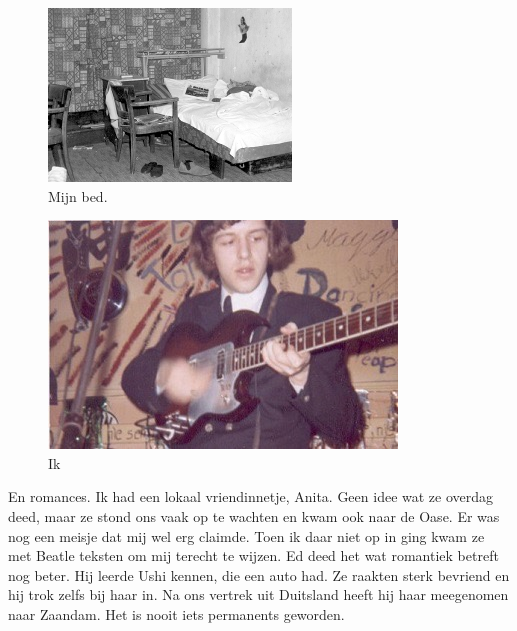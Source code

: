 \documentclass[10pt,twoside, openright]{memoir}
\begin{document}
\begin{figure}
\includegraphics[width=\textwidth]{img/ch29/soest}
\caption*{\footnotesize Mijn bed.}
\end{figure}

\begin{figure}
\includegraphics[width=\textwidth]{img/ch29/rockadzaan4}
\caption*{\footnotesize Ik}
\end{figure}

En romances. Ik had een lokaal vriendinnetje, Anita. Geen idee wat ze overdag deed, maar ze stond ons vaak op te wachten en kwam ook naar de Oase. Er was nog een meisje dat mij wel erg claimde. Toen ik daar niet op in ging kwam ze met Beatle teksten om mij terecht te wijzen. Ed deed het wat romantiek betreft nog beter. Hij leerde Ushi kennen, die een auto had. Ze raakten sterk bevriend en hij trok zelfs bij haar in. Na ons vertrek uit Duitsland heeft hij haar meegenomen naar Zaandam. Het is nooit iets permanents geworden.
\end{document}
